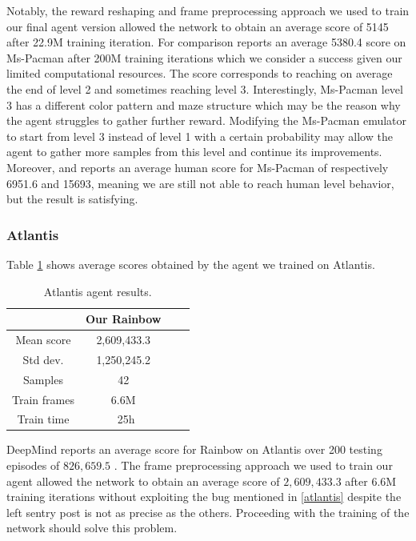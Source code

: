 \documentclass[10pt,twocolumn,letterpaper]{article}
\begin{document}
Notably, the reward reshaping and frame preprocessing approach we used to train our final agent version allowed the network to obtain an average score of 5145 after 22.9M training iteration. For comparison \cite{DBLP:journals/corr/abs-1710-02298} reports an average 5380.4 score on Ms-Pacman after 200M training iterations which we consider a success given our limited computational resources.
The score corresponds to reaching on average the end of level 2 and sometimes reaching level 3. Interestingly, Ms-Pacman level 3 has a different color pattern and maze structure which may be the reason why the agent struggles to gather further reward. Modifying the Ms-Pacman emulator to start from level 3 instead of level 1 with a certain probability may allow the agent to gather more samples from this level and continue its improvements.
Moreover, \cite{DBLP:journals/corr/WangFL15} and \cite{humancontrol} reports an average human score for Ms-Pacman of respectively 6951.6 and 15693, meaning we are still not able to reach human level behavior, but the result is satisfying.

\subsubsection{Atlantis}
Table \ref{tab:atlantis_results} shows average scores obtained by the agent we trained on Atlantis. 

\begin{table}
	\begin{center}
		\begin{tabular}{ |c|c|c|c| } 
			\hline
			& Our Rainbow \\ 
			\hline
			Mean score & 2,609,433.3 \\
			Std dev. & 1,250,245.2 \\
			Samples & 42 \\
			Train frames & 6.6M \\
			Train time & ~25h \\
			\hline
		\end{tabular}
	\end{center}
	\caption{Atlantis agent results.}
	\label{tab:atlantis_results}
\end{table}

DeepMind reports an average score for Rainbow on Atlantis over 200 testing episodes of $826,659.5$ \cite{DBLP:journals/corr/abs-1710-02298}. The frame preprocessing approach we used to train our agent allowed the network to obtain an average score of $2,609,433.3$ after $6.6$M training iterations without exploiting the bug mentioned in \ref{atlantis} despite the left sentry post is not as precise as the others.  Proceeding with the training of the network should solve this problem.
\end{document}
